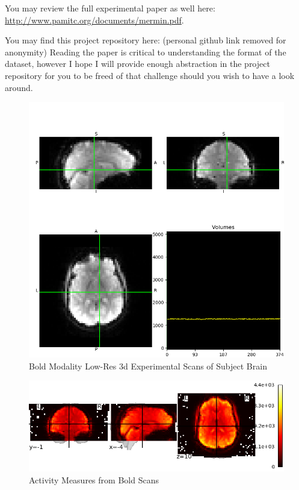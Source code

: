 \documentclass[10pt,twocolumn,letterpaper]{article}
\begin{document}
You may review the full experimental paper as well here: \url{http://www.pamitc.org/documents/mermin.pdf}.

You may find this project repository here: (personal github link removed for anonymity)
Reading the paper is critical to understanding the format of the dataset, however I hope I will provide enough
abstraction in the project repository for you to be freed of that challenge should you wish to have a look around.

\begin{figure}
  \includegraphics[width=\linewidth]{images/orthoview_bold.png}
  \caption{Bold Modality Low-Res 3d Experimental Scans of Subject Brain}
  \label{fig:ortho-bold}
\end{figure}

\begin{figure}
  \includegraphics[width=\linewidth]{images/example_stat_map.png}
  \caption{Activity Measures from Bold Scans}
  \label{fig:ex_stat_map}
\end{figure}
\end{document}
